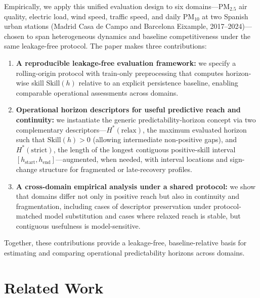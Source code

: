 \documentclass[pdflatex,sn-mathphys]{sn-jnl}
\begin{document}
Empirically, we apply this unified evaluation design to six domains—PM$_{2.5}$ air quality, electric load, wind speed, traffic speed, and daily PM$_{10}$ at two Spanish urban stations (Madrid Casa de Campo and Barcelona Eixample, 2017–2024)—chosen to span heterogeneous dynamics and baseline competitiveness under the same leakage-free protocol.
The paper makes three contributions:
\begin{enumerate}
  \item \textbf{A reproducible leakage-free evaluation framework:} we specify a rolling-origin protocol with train-only preprocessing that computes horizon-wise skill $\mathrm{Skill}(h)$ relative to an explicit persistence baseline, enabling comparable operational assessments across domains.
  \item \textbf{Operational horizon descriptors for useful predictive reach and continuity:} we instantiate the generic predictability-horizon concept via two complementary descriptors—$H^*(\mathrm{relax})$, the maximum evaluated horizon such that $\mathrm{Skill}(h)>0$ (allowing intermediate non-positive gaps), and $H^*(\mathrm{strict})$, the length of the longest contiguous positive-skill interval $[h_{\mathrm{start}},h_{\mathrm{end}}]$—augmented, when needed, with interval locations and sign-change structure for fragmented or late-recovery profiles.
  \item \textbf{A cross-domain empirical analysis under a shared protocol:} we show that domains differ not only in positive reach but also in continuity and fragmentation, including cases of descriptor preservation under protocol-matched model substitution and cases where relaxed reach is stable, but contiguous usefulness is model-sensitive.
\end{enumerate}
Together, these contributions provide a leakage-free, baseline-relative basis for estimating and comparing operational predictability horizons across domains.

\section{Related Work}
\end{document}
